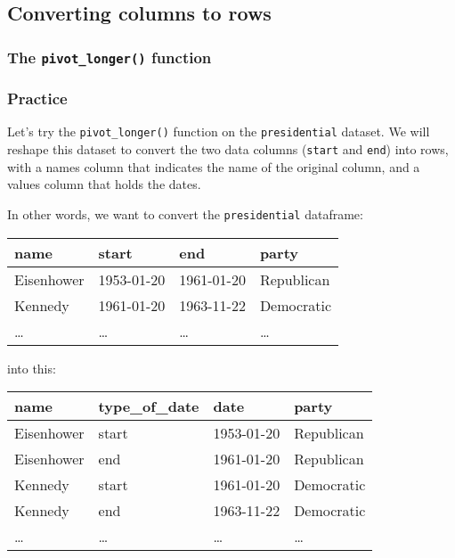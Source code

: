 \documentclass[
]{article}
\theoremstyle{definition}
\theoremstyle{definition}
\theoremstyle{definition}
\theoremstyle{definition}
\theoremstyle{remark}
\begin{document}
\hypertarget{converting-columns-to-rows}{%
\subsection{Converting columns to rows}\label{converting-columns-to-rows}}

\hypertarget{the-pivot_longer-function}{%
\subsubsection{\texorpdfstring{The \texttt{pivot\_longer()} function}{The pivot\_longer() function}}\label{the-pivot_longer-function}}

\hypertarget{practice-1}{%
\subsubsection{Practice}\label{practice-1}}

Let's try the \texttt{pivot\_longer()} function on the \texttt{presidential} dataset. We will reshape this dataset to convert the two data columns (\texttt{start} and \texttt{end}) into rows, with a names column that indicates the name of the original column, and a values column that holds the dates.

In other words, we want to convert the \texttt{presidential} dataframe:

\begin{longtable}[]{@{}llll@{}}
\toprule()
name & start & end & party \\
\midrule()
\endhead
Eisenhower & 1953-01-20 & 1961-01-20 & Republican \\
Kennedy & 1961-01-20 & 1963-11-22 & Democratic \\
\ldots{} & \ldots{} & \ldots{} & \ldots{} \\
\bottomrule()
\end{longtable}

into this:

\begin{longtable}[]{@{}llll@{}}
\toprule()
name & type\_of\_date & date & party \\
\midrule()
\endhead
Eisenhower & start & 1953-01-20 & Republican \\
Eisenhower & end & 1961-01-20 & Republican \\
Kennedy & start & 1961-01-20 & Democratic \\
Kennedy & end & 1963-11-22 & Democratic \\
\ldots{} & \ldots{} & \ldots{} & \ldots{} \\
\bottomrule()
\end{longtable}
\end{document}
